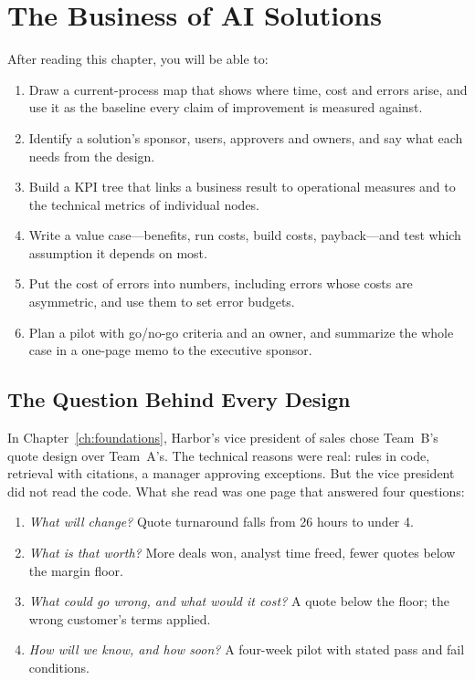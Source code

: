 
\chapter{The Business of AI Solutions}
\label{ch:business}

\begin{objectives}
After reading this chapter, you will be able to:
\begin{enumerate}[leftmargin=*,itemsep=2pt]
  \item Draw a current-process map that shows where time, cost and errors arise, and use it as the baseline every claim of improvement is measured against.
  \item Identify a solution's sponsor, users, approvers and owners, and say what each needs from the design.
  \item Build a KPI tree that links a business result to operational measures and to the technical metrics of individual nodes.
  \item Write a value case---benefits, run costs, build costs, payback---and test which assumption it depends on most.
  \item Put the cost of errors into numbers, including errors whose costs are asymmetric, and use them to set error budgets.
  \item Plan a pilot with go/no-go criteria and an owner, and summarize the whole case in a one-page memo to the executive sponsor.
\end{enumerate}
\end{objectives}

\section{The Question Behind Every Design}
\label{sec:business-question}

In Chapter~\ref{ch:foundations}, Harbor's vice president of sales chose Team~B's quote design over Team~A's. The technical reasons were real: rules in code, retrieval with citations, a manager approving exceptions. But the vice president did not read the code. What she read was one page that answered four questions:
\begin{enumerate}[itemsep=1pt]
  \item \emph{What will change?} Quote turnaround falls from 26 hours to under 4.
  \item \emph{What is that worth?} More deals won, analyst time freed, fewer quotes below the margin floor.
  \item \emph{What could go wrong, and what would it cost?} A quote below the floor; the wrong customer's terms applied.
  \item \emph{How will we know, and how soon?} A four-week pilot with stated pass and fail conditions.
\end{enumerate}

